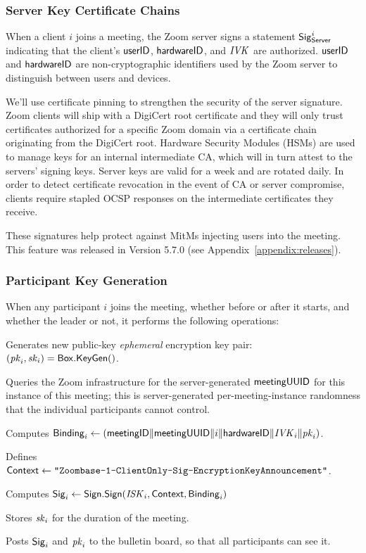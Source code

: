 \subsubsection{Server Key Certificate Chains}
\label{subsubsec:servercert}

When a client $i$ joins a meeting, the Zoom server signs a statement ${\sf Sig}^i_{\mathsf{Server}}$
indicating that the client's $\mathsf{userID}$, ${\sf hardwareID}$, and $\mathit{IVK}$ are authorized. $\mathsf{userID}$ and
${\sf hardwareID}$ are non-cryptographic identifiers used by the Zoom server to distinguish between users
and devices.

We'll use certificate pinning to strengthen the security of the server signature. Zoom clients will
ship with a DigiCert root certificate and they will only trust certificates authorized for a
specific Zoom domain via a certificate chain originating from the DigiCert root. Hardware Security
Modules (HSMs) are used to manage keys for an internal intermediate CA, which will in turn attest to
the servers' signing keys. Server keys are valid for a week and are rotated daily. In order to
detect certificate revocation in the event of CA or server compromise, clients require stapled OCSP
responses on the intermediate certificates they receive.

These signatures help protect against MitMs injecting users into the meeting. This feature was
released in Version 5.7.0 (see Appendix~\ref{appendix:releases}).

\subsubsection{Participant Key Generation}
\label{subsubsec:partikeygen}
When any participant $i$ joins the meeting, whether before or after it starts, and whether the
leader or not, it performs the following operations:

\begingroup
\RaggedRight
\begin{enumerate*}
\item Generates new public-key \textit{ephemeral} encryption key pair: $(\mathit{pk}_i, \mathit{sk}_i) =
{\sf Box}.\mathsf{KeyGen}()$.
\item Queries the Zoom infrastructure for the server-generated ${\sf meetingUUID}$ for this instance of
this meeting; this is server-generated per-meeting-instance randomness that the individual
participants cannot control.
\item Computes ${\sf Binding}_i \leftarrow \left( {\sf meetingID} \| \allowbreak {\sf meetingUUID} \| i \allowbreak
\| {\sf hardwareID} \| \mathit{IVK}_i \| \allowbreak \mathit{pk}_i \right)$.
\item Defines ${\sf Context} \leftarrow \texttt{"Zoombase-1-ClientOnly-Sig-EncryptionKeyAnnouncement"}$.
\item Computes ${\sf Sig}_i \leftarrow {\sf Sign}.\mathsf{Sign}(\mathit{ISK}_i, {\sf Context}, {\sf Binding}_i)$
\item Stores $\mathit{sk}_i$ for the duration of the meeting.
\item Posts ${\sf Sig}_i$ and $\mathit{pk}_i$ to the bulletin board, so that all participants can see it.
\end{enumerate*}
\endgroup

